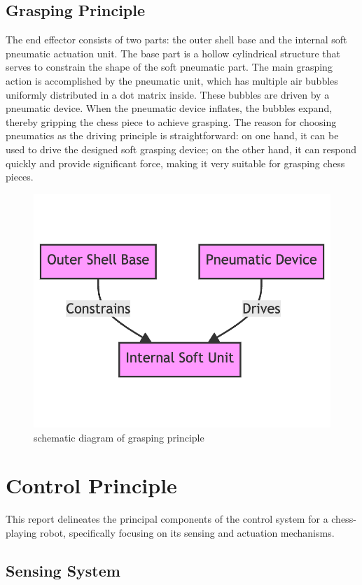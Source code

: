 \documentclass[10pt, a4paper, twocolumn]{article}
\begin{document}
\subsection{Grasping Principle}
The end effector consists of two parts: the outer shell base and the internal soft pneumatic actuation unit. The base part is a hollow cylindrical structure that serves to constrain the shape of the soft pneumatic part. The main grasping action is accomplished by the pneumatic unit, which has multiple air bubbles uniformly distributed in a dot matrix inside. These bubbles are driven by a pneumatic device. When the pneumatic device inflates, the bubbles expand, thereby gripping the chess piece to achieve grasping. The reason for choosing pneumatics as the driving principle is straightforward: on one hand, it can be used to drive the designed soft grasping device; on the other hand, it can respond quickly and provide significant force, making it very suitable for grasping chess pieces.

\begin{figure}
    \centering
    \includegraphics[width=0.6\linewidth]{grasping principle.png}
    \caption{schematic diagram of grasping principle}
    \label{fig:grasping principle}
\end{figure}

\section{Control Principle}

This report delineates the principal components of the control system for a chess-playing robot, specifically focusing on its sensing and actuation mechanisms.

\subsection{Sensing System}
\end{document}
